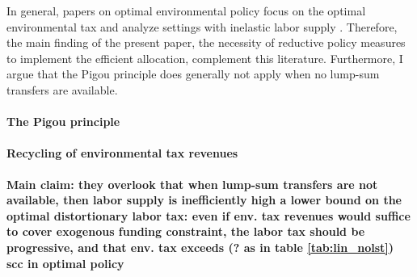 In general, papers on optimal environmental policy focus on the optimal environmental tax and analyze settings with inelastic labor supply \citep{Golosov2014OptimalEquilibrium, Acemoglu2012TheChang, Fried2018ClimateAnalysis}. Therefore, the main finding of the present paper, the necessity of reductive policy measures to implement the efficient allocation, complement this literature. Furthermore, I argue that the Pigou principle does generally not apply when no lump-sum transfers are available.  

\paragraph{The Pigou principle }


\paragraph{Recycling of environmental tax revenues}
\textbf{Main claim: they overlook that when lump-sum transfers are not available, then labor supply is inefficiently high \ar a lower bound on the optimal distortionary labor tax: even if env. tax revenues would suffice to cover exogenous funding constraint, the labor tax should be progressive, and that env. tax exceeds (? as in table \ref{tab:lin_nolst}) scc in optimal policy}
